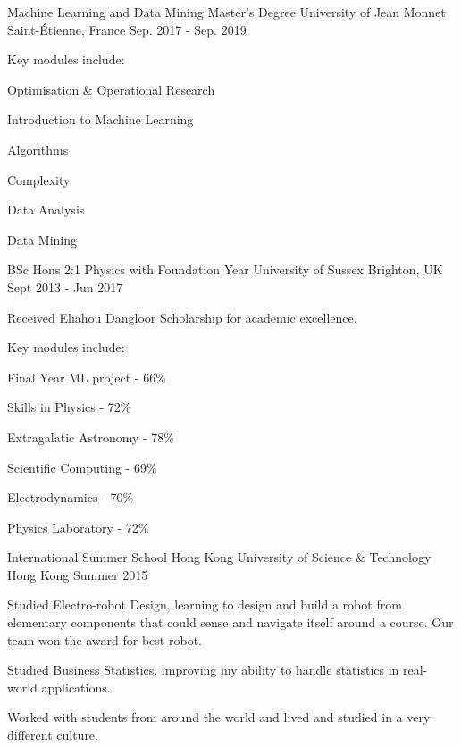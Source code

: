 \begin{cventries}
	\cventry
	{Machine Learning and Data Mining Master's Degree}
	{University of Jean Monnet}
	{Saint-\'{E}tienne, France}
	{Sep. 2017 - Sep. 2019}
	{
		\begin{cvitems}
			\item{Key modules include:}
			\setlength\multicolsep{0pt}
			\begin{multicols}{3}
				\item{Optimisation \& Operational Research}
				\item{Introduction to Machine Learning}
				\item{Algorithms}
				\item{Complexity}
				\item{Data Analysis}
				\item{Data Mining}
			\end{multicols}
		\end{cvitems}
	}
	
	\cventry
    {BSc Hons 2:1 Physics with Foundation Year}
    {University of Sussex}
    {Brighton, UK}
    {Sept 2013 - Jun 2017}
    {
      \begin{cvitems}
      \item{Received Eliahou Dangloor Scholarship for academic excellence.}
      \item{Key modules include:}
      \setlength\multicolsep{0pt}
      \begin{multicols}{3}
        \item{Final Year ML project - 66\% }
        \item{Skills in Physics - 72\%}
        \item{Extragalatic Astronomy - 78\%}
        \item{Scientific Computing - 69\%}
        \item{Electrodynamics - 70\%}
        \item{Physics Laboratory - 72\%}
      \end{multicols}
      \end{cvitems}
    }
    
	\cventry
	{International Summer School}
	{Hong Kong University of Science \& Technology}
	{Hong Kong}
	{Summer 2015}
	{
		\begin{cvitems}
			\item {Studied Electro-robot Design, learning to design and build a robot from elementary components that could sense and navigate itself around a course. Our team won the award for best robot.}
			\item {Studied Business Statistics, improving my ability to handle statistics in real-world applications.}
			\item {Worked with students from around the world and lived and studied in a very different culture.}
		\end{cvitems}
	}
	

\end{cventries}
